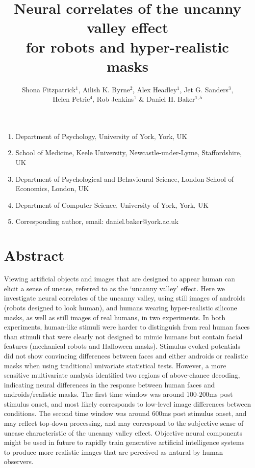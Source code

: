 \documentclass[
]{article}
\title{Neural correlates of the uncanny valley effect\\
for robots and hyper-realistic masks}
\author{Shona Fitzpatrick\(^1\), Ailish K. Byrne\(^2\), Alex Headley\(^1\), Jet G. Sanders\(^3\),\\
Helen Petrie\(^4\), Rob Jenkins\(^1\) \& Daniel H. Baker\(^{1,5}\)}
\date{}
\providecommand{\tightlist}{%
  \setlength{\itemsep}{0pt}\setlength{\parskip}{0pt}}
\begin{document}
\maketitle

\begin{enumerate}
\def\labelenumi{\arabic{enumi}.}
\tightlist
\item
  Department of Psychology, University of York, York, UK
\item
  School of Medicine, Keele University, Newcastle-under-Lyme, Staffordshire, UK
\item
  Department of Psychological and Behavioural Science, London School of Economics, London, UK
\item
  Department of Computer Science, University of York, York, UK
\item
  Corresponding author, email: daniel.baker@york.ac.uk
\end{enumerate}

\section{Abstract}\label{abstract}

Viewing artificial objects and images that are designed to appear human can elicit a sense of unease, referred to as the `uncanny valley' effect. Here we investigate neural correlates of the uncanny valley, using still images of androids (robots designed to look human), and humans wearing hyper-realistic silicone masks, as well as still images of real humans, in two experiments. In both experiments, human-like stimuli were harder to distinguish from real human faces than stimuli that were clearly not designed to mimic humans but contain facial features (mechanical robots and Halloween masks). Stimulus evoked potentials did not show convincing differences between faces and either androids or realistic masks when using traditional univariate statistical tests. However, a more sensitive multivariate analysis identified two regions of above-chance decoding, indicating neural differences in the response between human faces and androids/realistic masks. The first time window was around 100-200ms post stimulus onset, and most likely corresponds to low-level image differences between conditions. The second time window was around 600ms post stimulus onset, and may reflect top-down processing, and may correspond to the subjective sense of unease characteristic of the uncanny valley effect. Objective neural components might be used in future to rapidly train generative artificial intelligence systems to produce more realistic images that are perceived as natural by human observers.
\end{document}
